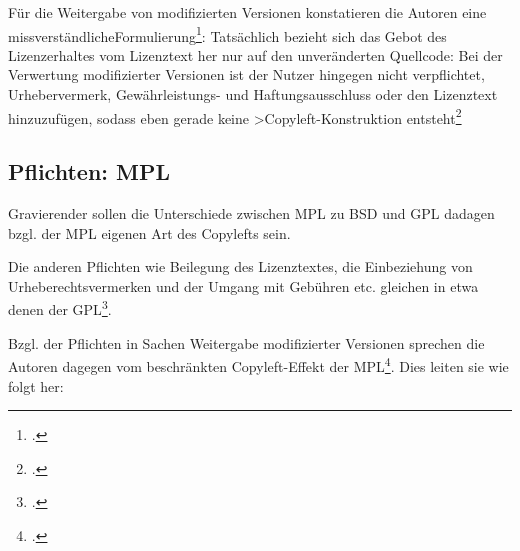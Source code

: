 \documentclass[DIV=calc,BCOR=5mm,11pt,headings=small,oneside,abstract=true, toc=bib]{scrartcl}
\begin{document}
Für die Weitergabe von modifizierten Versionen konstatieren die Autoren eine
\glqq{}missverständliche\grqq{}Formulierung\footcite[vgl.][343]{ArlBriVol2004a}:
Tatsächlich bezieht sich das Gebot des Lizenzerhaltes vom Lizenztext her nur auf
den unveränderten Quellcode: \glqq{}Bei der Verwertung modifizierter
Versionen ist der Nutzer hingegen nicht verpflichtet, Urhebervermerk,
Gewährleistungs- und Haftungsausschluss oder den Lizenztext hinzuzufügen\grqq{},
sodass eben gerade keine >Copyleft-Konstruktion
entsteht\footcite[vgl.][344]{ArlBriVol2004a}

\subsection{Pflichten: MPL}

Gravierender sollen die Unterschiede zwischen MPL zu BSD und GPL dadagen bzgl.
der MPL eigenen Art des Copylefts sein.

Die anderen Pflichten wie \glqq{}Beilegung des Lizenztextes\grqq{}, die
\glqq{}Einbeziehung von Urheberechtsvermerken\grqq{} und der Umgang mit Gebühren
etc. gleichen in etwa denen der GPL\footcite[vgl.][346f]{ArlBriVol2004a}.

Bzgl. der Pflichten in Sachen Weitergabe modifizierter Versionen sprechen die
Autoren dagegen vom \glqq{}beschränkten Copyleft-Effekt der
MPL\grqq{}\footcite[vgl.][348]{ArlBriVol2004a}. Dies leiten sie wie folgt her:
\end{document}
